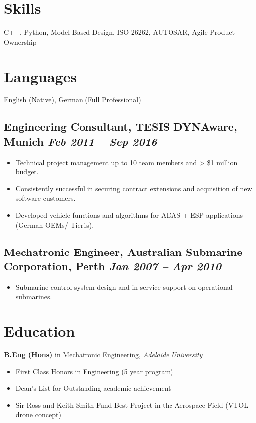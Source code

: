 \documentclass[10pt,a4paper]{article}
\begin{document}
\section*{Skills}
C++, Python, Model-Based Design, ISO 26262, AUTOSAR, Agile Product Ownership

\vspace{1.2em}

\section*{Languages}
English (Native), German (Full Professional)


\subsection*{Engineering Consultant, TESIS DYNAware, Munich \hfill \textit{Feb 2011 – Sep 2016}}
\begin{itemize}
    \item Technical project management up to 10 team members and > \$1 million budget.
    \item Consistently successful in securing contract extensions and acquisition of new software customers.
    \item Developed vehicle functions and algorithms for ADAS + ESP applications (German OEMs/ Tier1s).
\end{itemize}

\subsection*{Mechatronic Engineer, Australian Submarine Corporation, Perth \hfill \textit{Jan 2007 – Apr 2010}}
\begin{itemize}
    \item Submarine control system design and in-service support on operational submarines.
\end{itemize}

\vspace{1.2em}

\section*{Education}

\textbf{\textcolor{primary}{B.Eng (Hons)}} in Mechatronic Engineering, \textit{Adelaide University} \\
\begin{itemize}
    \item First Class Honors in Engineering (5 year program)
    \item Dean's List for Outstanding academic achievement
    \item Sir Ross and Keith Smith Fund Best Project in the Aerospace Field (VTOL drone concept)
\end{itemize}
\end{document}

